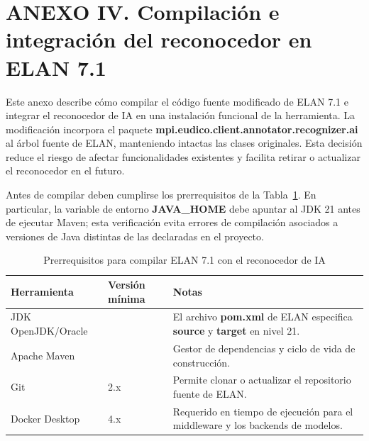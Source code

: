 
\section*{\normalfont ANEXO IV. Compilación e integración del reconocedor en ELAN 7.1}
\label{anx:compilacion_elan}

\renewcommand{\thetable}{D.\arabic{table}}
\setcounter{table}{0}
\renewcommand{\thecodigo}{D.\arabic{codigo}}
\setcounter{codigo}{0}
\renewcommand{\thefigure}{D.\arabic{figure}}
\setcounter{figure}{0}

Este anexo describe cómo compilar el código fuente modificado de ELAN 7.1 e integrar el reconocedor de IA en una instalación funcional de la herramienta. La modificación incorpora el paquete \textbf{mpi.eudico.client.annotator.recognizer.ai} al árbol fuente de ELAN, manteniendo intactas las clases originales. Esta decisión reduce el riesgo de afectar funcionalidades existentes y facilita retirar o actualizar el reconocedor en el futuro.

Antes de compilar deben cumplirse los prerrequisitos de la Tabla~\ref{tab:prerrequisitos}. En particular, la variable de entorno \textbf{JAVA\_HOME} debe apuntar al JDK 21 antes de ejecutar Maven; esta verificación evita errores de compilación asociados a versiones de Java distintas de las declaradas en el proyecto.

\begin{table}[H]
\centering
\caption{Prerrequisitos para compilar ELAN 7.1 con el reconocedor de IA}
\label{tab:prerrequisitos}
\scriptsize
\renewcommand{\arraystretch}{1.08}
\setlength{\tabcolsep}{4pt}

\begin{tabular}{
    >{\raggedright\arraybackslash}p{3.3cm}
    >{\raggedright\arraybackslash}p{2.4cm}
    >{\raggedright\arraybackslash}p{7.4cm}
}
\toprule
\textbf{Herramienta} & \textbf{Versión mínima} & \textbf{Notas} \\
\midrule
JDK OpenJDK/Oracle &
21 &
El archivo \textbf{pom.xml} de ELAN especifica \textbf{source} y \textbf{target} en nivel 21. \\

Apache Maven &
3.8 &
Gestor de dependencias y ciclo de vida de construcción. \\

Git &
2.x &
Permite clonar o actualizar el repositorio fuente de ELAN. \\

Docker Desktop &
4.x &
Requerido en tiempo de ejecución para el middleware y los backends de modelos. \\
\bottomrule
\end{tabular}
\end{table}


